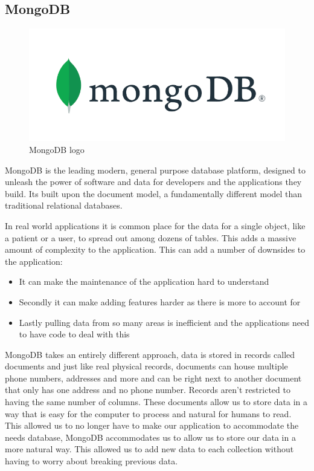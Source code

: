 \subsection{MongoDB}
\begin{figure}[th]
\renewcommand\thefigure{3.3}
\centering
\includegraphics[scale = 0.5]{img/MongoDB-logo.png}
\caption{MongoDB logo}
\label{MongoDB}
\end{figure}

MongoDB is the leading modern, general purpose database platform, designed to unleash the power of software and data for developers and the applications they build. Its built upon the document model, a fundamentally different model than traditional relational databases. \par
In real world applications it is common place for the data for a single object, like a patient or a user, to spread out among dozens of tables. This adds a massive amount of complexity to the application. This can add a number of downsides to the application:
\begin{itemize}
\item It can make the maintenance of the application hard to understand
\item Secondly it can make adding features harder as there is more to account for
\item Lastly pulling data from so many areas is inefficient and the applications need to have code to deal with this
\end{itemize}
\par MongoDB takes an entirely different approach, data is stored in records called documents and just like real physical records, documents can house multiple phone numbers, addresses and more and can be right next to another document that only has one address and no phone number. Records aren't restricted to having the same number of columns. These documents allow us to store data in a way that is easy for the computer to process and natural for humans to read. This allowed us to no longer have to make our application to accommodate the needs database, MongoDB accommodates us to allow us to store our data in a more natural way. This allowed us to add new data to each collection without having to worry about breaking previous data. \par

